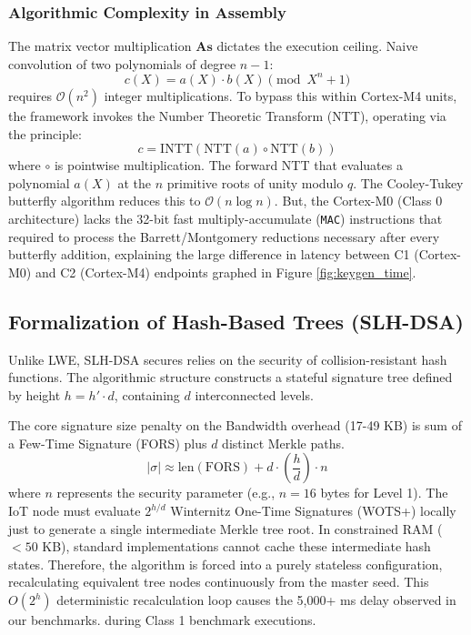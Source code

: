 \subsubsection{Algorithmic Complexity in Assembly}
The matrix vector multiplication $\mathbf{A}\mathbf{s}$ dictates the execution ceiling. Naive convolution of two polynomials of degree $n-1$:
\begin{equation}
c(X) = a(X) \cdot b(X) \pmod{X^n+1}
\end{equation}
requires $\mathcal{O}(n^2)$ integer multiplications. To bypass this within Cortex-M4 units, the framework invokes the Number Theoretic Transform (NTT), operating via the principle:
\begin{equation}
c = \text{INTT}(\text{NTT}(a) \circ \text{NTT}(b))
\end{equation}
where $\circ$ is pointwise multiplication. The forward NTT that evaluates a polynomial $a(X)$ at the $n$ primitive roots of unity modulo $q$. The Cooley-Tukey butterfly algorithm reduces this to $\mathcal{O}(n\log n)$. But, the Cortex-M0 (Class 0 architecture) lacks the 32-bit fast multiply-accumulate (\texttt{MAC}) instructions that required to process the Barrett/Montgomery reductions necessary after every butterfly addition, explaining the large difference in latency between C1 (Cortex-M0) and C2 (Cortex-M4) endpoints graphed in Figure \ref{fig:keygen_time}.

\subsection{Formalization of Hash-Based Trees (SLH-DSA)}

Unlike LWE, SLH-DSA secures relies on the security of collision-resistant hash functions. The algorithmic structure constructs a stateful signature tree defined by height $h = h' \cdot d$, containing $d$ interconnected levels.

The core signature size penalty on the Bandwidth overhead (17-49 KB) is sum of a Few-Time Signature (FORS) plus $d$ distinct Merkle paths.
\begin{equation}
|\sigma| \approx \text{len}(\text{FORS}) + d \cdot \left( \frac{h}{d} \right) \cdot n
\end{equation}
where $n$ represents the security parameter (e.g., $n=16$ bytes for Level 1). The IoT node must evaluate $2^{h/d}$ Winternitz One-Time Signatures (WOTS+) locally just to generate a single intermediate Merkle tree root. In constrained RAM ($<50$ KB), standard implementations cannot cache these intermediate hash states. Therefore, the algorithm is forced into a purely stateless configuration, recalculating equivalent tree nodes continuously from the master seed. This $O(2^h)$ deterministic recalculation loop causes the 5,000+ ms delay observed in our benchmarks. during Class 1 benchmark executions.
